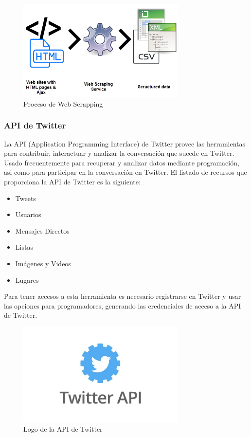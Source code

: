 \documentclass[a4paper,12pt]{article}
\theoremstyle{definition}
\theoremstyle{remark}
\begin{document}
\begin{figure}[htb]
\centering
\includegraphics[width=0.75\textwidth]{figures/web-scraping-service.png}
\caption{Proceso de Web Scrapping}
\end{figure}

\subsubsection{API de Twitter}
La API (Application Programming Interface) de Twitter provee las herramientas para contribuir, interactuar y analizar la conversación que sucede en Twitter. Usado frecuentemente para recuperar y analizar datos mediante programación, asi como para participar en la conversación en Twitter. El listado de recursos que proporciona la API de Twitter es la siguiente:
\begin{itemize}
    \item Tweets
    \item Usuarios
    \item Mensajes Directos
    \item Listas
    \item Imágenes y Videos
    \item Lugares
\end{itemize}

Para tener accesos a esta herramienta es necesario registrarse en Twitter y usar las opciones para programadores, generando las credenciales de acceso a la API de Twitter.

\begin{figure}[htb]
\centering
\includegraphics[width=0.75\textwidth]{figures/twitter-api.jpg}
\caption{Logo de la API de Twitter}
\end{figure}
\end{document}
